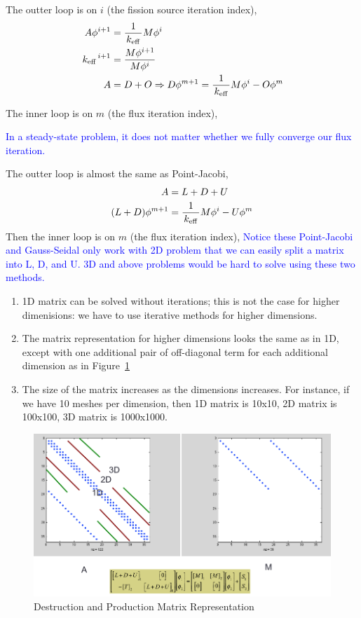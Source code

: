 \documentclass{school-22.211-notes}
\begin{document}
The outter loop is on $i$ (the fission source iteration index), 
\begin{align}
A \phi^{i+1} &= \frac{1}{\left. k_{\mathrm{eff}} \right.} M \phi^i \\
\left. k_{\mathrm{eff}} \right.^{i+1} &= \frac{M \phi^{i+1}}{M \phi^i} \\
A &= D + O \Rightarrow D \phi^{m+1} = \frac{1}{\left. k_{\mathrm{eff}} \right.} M \phi^i - O \phi^m 
\end{align}

The inner loop is on $m$ (the flux iteration index), 

\textcolor{blue}{In a steady-state problem, it does not matter whether we fully converge our flux iteration.} 


The outter loop is almost the same as Point-Jacobi, 
\begin{align}
A &= L + D + U  \\
(L + D ) \phi^{m+1} &= \frac{1}{\left. k_{\mathrm{eff}} \right.} M \phi^i - U \phi^m 
\end{align}
Then the inner loop is on $m$ (the flux iteration index), 
\textcolor{blue}{Notice these Point-Jacobi and Gauss-Seidal only work with 2D problem that we can easily split a matrix into L, D, and U. 3D and above problems would be hard to solve using these two methods.} 


\begin{enumerate}
\item 1D matrix can be solved without iterations; this is not the case for higher dimenisions: we have to use iterative methods for higher dimensions. 
\item The matrix representation for higher dimensions looks the same as in 1D, except with one additional pair of off-diagonal term for each additional dimension as in Figure~\ref{matrix-shape}
\item The size of the matrix increases as the dimensions increases. For instance, if we have 10 meshes per dimension, then 1D matrix is 10x10, 2D matrix is 100x100, 3D matrix is 1000x1000.
\end{enumerate}
\begin{figure}[ht]
  \centering
  \includegraphics[width=5in]{images/dfs/matrix_multidimension.png}
  \caption{Destruction and Production Matrix Representation} \label{matrix-shape}
\end{figure}
\end{document}
